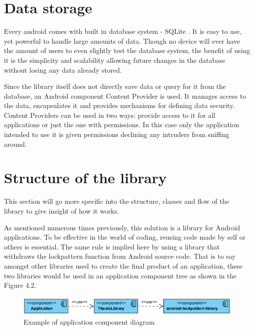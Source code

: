 \section{Data storage}
Every android comes with built in database system - SQLite \cite{sqlite}. It is easy to use, yet powerful to handle large amounts of data. Though no device will ever have the amount of users to even slightly test the database system, the benefit of using it is the simplicity and scalability allowing future changes in the database without losing any data already stored.

Since the library itself does not directly save data or query for it from the database, an Android component Content Provider \cite{contentprovider} is used. It manages access to the data, encapsulates it and provides mechanisms for defining data security. Content Providers can be used in two ways: provide access to it for all applications or just the one with permissions. In this case only the application intended to use it is given permissions declining any intruders from sniffing around.

\section{Structure of the library}
This section will go more specific into the structure, classes and flow of the library to give insight of how it works.

As mentioned numerous times previously, this solution is a library for Android applications. To be effective in the world of coding, reusing code made by self or others is essential. The same rule is implied here by using a library that withdraws the lockpattern function from Android source code. That is to say amongst other libraries used to create the final product of an application, these two libraries would be used in an application component tree as shown in the Figure 4.2.

\begin{figure}[h]
\begin{center}
\includegraphics[scale=0.9]{images/componentdiagram.png}
\caption{Example of application component diagram} \label{fig:component diagram} 
\end{center}
\end{figure}


